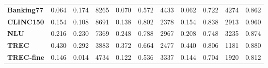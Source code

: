 \documentclass{article}
\theoremstyle{plain}
\theoremstyle{definition}
\theoremstyle{remark}
\newcommand{\banking}{Banking77\xspace}
\newcommand{\clinic}{CLINC150\xspace}
\newcommand{\trec}{TREC\xspace}
\newcommand{\trecfine}{TREC-fine\xspace}
\newcommand{\nlu}{NLU\xspace}
\begin{document}
\begin{table}[t]
{\begin{tabular}{l ccc ccc ccc c}
\midrule
\textbf{\banking}  & 0.064 & 0.174 & 8265 & 0.070 & 0.572 & 4433 & 0.062 & 0.722 & 4274 & 0.862 \\
\textbf{\clinic}   & 0.154 & 0.108 & 8691 & 0.138 & 0.802 & 2378 & 0.154 & 0.838 & 2913 & 0.960 \\
\textbf{\nlu}        & 0.216 & 0.230 & 7369 & 0.248 & 0.788 & 2967 & 0.208 & 0.748 & 3235 & 0.874 \\
\textbf{\trec}       & 0.430 & 0.292 & 3883 & 0.372 & 0.664 & 2477 & 0.440 & 0.806 & 1181 & 0.880 \\
\textbf{\trecfine}  & 0.146 & 0.014 & 4734 & 0.122 & 0.536 & 3337 & 0.144 & 0.704 & 1920 & 0.812 \\
\midrule[\heavyrulewidth]
\end{tabular}
\label{tab:main_results:qwen}
}
\label{tab:main_results}
\end{table}
\end{document}

